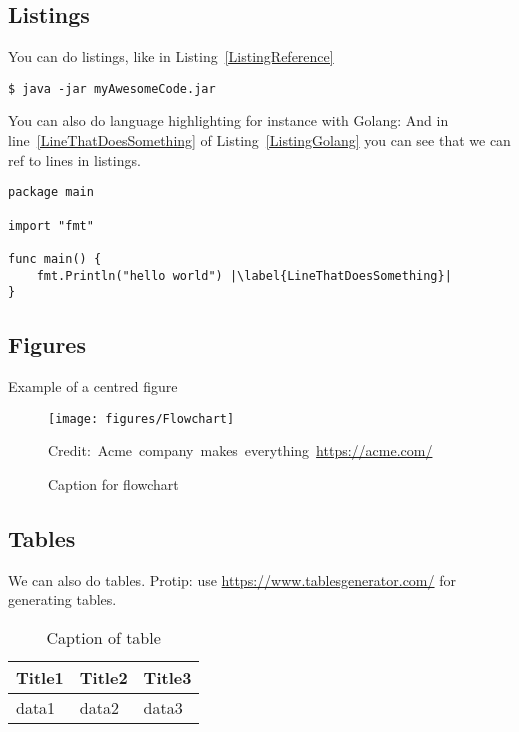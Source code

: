 \subsection{Listings}
You can do listings, like in Listing~\ref{ListingReference}
\begin{lstlisting}[caption={[Short caption]Look at this cool listing. Find the rest in Appendix~\ref{Listing}},label=ListingReference]
$ java -jar myAwesomeCode.jar
\end{lstlisting}

You can also do language highlighting for instance with Golang:
And in line~\ref{LineThatDoesSomething} of Listing~\ref{ListingGolang} you can see that we can ref to lines in listings.

\begin{lstlisting}[caption={Hello world in Golang},label=ListingGolang,escapechar=|]
package main

import "fmt"

func main() {
    fmt.Println("hello world") |\label{LineThatDoesSomething}|
}

\end{lstlisting}

\subsection{Figures}

Example of a centred figure
\begin{figure}[H]
    \centering
    \texttt{[image: figures/Flowchart]}
    \caption{Caption for flowchart}
  	\medskip 
	\hspace*{15pt}\hbox{\scriptsize Credit: Acme company makes everything \url{https://acme.com/}}
    \label{FlowchartFigure}
\end{figure}

\subsection{Tables}

We can also do tables. Protip: use \url{https://www.tablesgenerator.com/} for generating tables.
\begin{table}[H]
\centering
\caption{Caption of table}
\label{TableLabel}
\begin{tabular}{|l|l|l|}
\hline
Title1 & Title2 & Title3 \\ \hline
data1  & data2  & data3  \\ \hline
\end{tabular}
\end{table}

\subsection{}